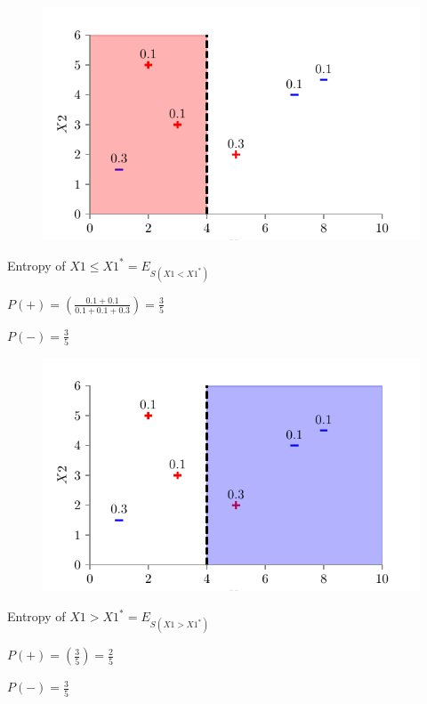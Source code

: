 \documentclass[usenames,dvipsnames]{beamer}
\begin{document}
\begin{frame}
\begin{figure}
	\centering
	\includegraphics{../figures/dt_weighted/fig4.pdf}
\end{figure}

Entropy of \(X1 \leq X1^*  = E_{S(X1 < X1^*)}\)

\(P(+) = \left( \frac{0.1 + 0.1}{0.1 + 0.1 + 0.3} \right) = \frac{3}{5}\)

\(P(-) = \frac{3}{5}\)


\end{frame}


\begin{frame}

\begin{figure}
	\centering
	\includegraphics{../figures/dt_weighted/fig5.pdf}
\end{figure}
Entropy of \(X1  > X1^*  = E_{S(X1 > X1^*)}\)

\(P(+) = \left( \frac{3}{5} \right) = \frac{2}{5}\)

\(P(-) = \frac{3}{5}\)

\end{frame}
\end{document}
